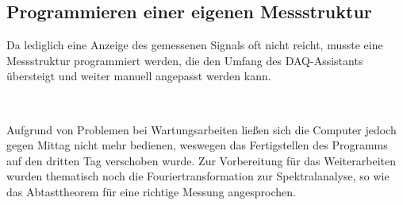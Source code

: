 	\subsection{Programmieren einer eigenen Messstruktur}
	
		Da lediglich eine Anzeige des gemessenen Signals oft nicht reicht, musste eine Messstruktur programmiert werden, die den Umfang des DAQ-Assistants übersteigt und weiter manuell angepasst werden kann.
			
		\
		
		Aufgrund von Problemen bei Wartungsarbeiten ließen sich die Computer jedoch gegen Mittag nicht mehr bedienen, weswegen das Fertigstellen des Programms auf den dritten Tag verschoben wurde. 
		Zur Vorbereitung für das Weiterarbeiten wurden thematisch noch die Fouriertransformation zur Spektralanalyse, so wie das Abtasttheorem für eine richtige Messung angesprochen.
			
		\
		